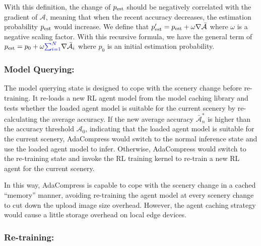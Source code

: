 With this definition, \textcolor{revise}{the change of $ p_{\rm est} $ should be negatively correlated with} the gradient of $ \mathcal{A} $, meaning that when the recent accuracy decreases, the estimation probability $ p_{\rm est} $ would increase. We define that $ p'_{\rm est} = p_{\rm est} + \omega \nabla \bar{\mathcal{A}} $ where $ \omega $ is a \textcolor{revise}{negative} scaling factor. With this recursive formula, we have the general term of $p_{\rm est} = p_0 + \omega {\color{revise}\sum_{i=1}^{N}} \nabla \bar{\mathcal{A}_i} $ where $ p_0 $ is an initial estimation probability.


\subsubsection{Model Querying:}

The model querying state is designed to cope with the scenery change before re-training. It re-loads a new RL agent model from the model caching library and tests whether the loaded agent model is suitable for the current scenery by re-calculating the average accuracy. If the new average accuracy $ \bar{\mathcal{A}}^*_n $ is higher than the accuracy threshold $ \mathcal{A}_0 $, indicating that the loaded agent model is suitable for the current scenery, AdaCompress would switch to the normal inference state and use the loaded agent model to infer. Otherwise, AdaCompress would switch to the re-training state and invoke the RL training kernel to re-train a new RL agent for the current scenery.

In this way, AdaCompress is capable to cope with the scenery change in a cached ``memory'' manner, avoiding re-training the agent model at every scenery change to cut down the upload image size overhead. However, the agent caching strategy would cause a little storage overhead on local edge devices.


\subsubsection{Re-training:}

